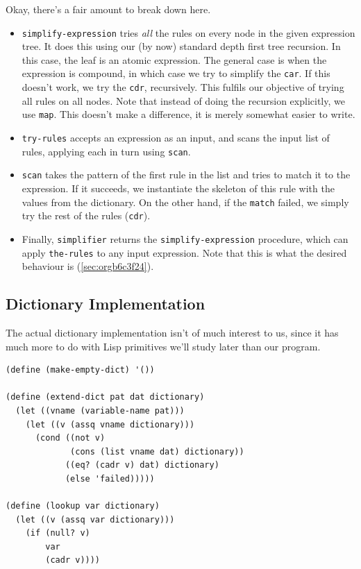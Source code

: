 \documentclass[9pt]{report}
\begin{document}
Okay, there's a fair amount to break down here.
\begin{itemize}
\item \texttt{simplify-expression} tries \emph{all} the rules on every node in the
given expression tree. It does this using our (by now) standard
depth first tree recursion. In this case, the leaf is an atomic
expression. The general case is when the expression is compound,
in which case we try to simplify the \texttt{car}. If this doesn't
work, we try the \texttt{cdr}, recursively. This fulfils our objective
of trying all rules on all nodes. Note that instead of doing the
recursion explicitly, we use \texttt{map}. This doesn't make a
difference, it is merely somewhat easier to write.
\item \texttt{try-rules} accepts an expression as an input, and scans the
input list of rules, applying each in turn using \texttt{scan}.
\item \texttt{scan} takes the pattern of the first rule in the list and tries
to match it to the expression. If it succeeds, we instantiate
the skeleton of this rule with the values from the dictionary.
On the other hand, if the \texttt{match} failed, we simply try the rest
of the rules (\texttt{cdr}).
\item Finally, \texttt{simplifier} returns the \texttt{simplify-expression}
procedure, which can apply \texttt{the-rules} to any input expression.
Note that this is what the desired behaviour is (\ref{sec:orgb6c3f24}).
\end{itemize}

\subsection{Dictionary Implementation}
\label{sec:org6446329}
The actual dictionary implementation isn't of much interest to us,
since it has much more to do with Lisp primitives we'll study
later than our program.

\begin{verbatim}
(define (make-empty-dict) '())

(define (extend-dict pat dat dictionary)
  (let ((vname (variable-name pat)))
    (let ((v (assq vname dictionary)))
      (cond ((not v)
             (cons (list vname dat) dictionary))
            ((eq? (cadr v) dat) dictionary)
            (else 'failed)))))

(define (lookup var dictionary)
  (let ((v (assq var dictionary)))
    (if (null? v)
        var
        (cadr v))))
\end{verbatim}
\end{document}
